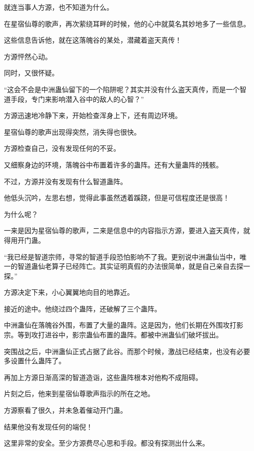 
\begin{this_body}



就连当事人方源，也不知道为什么。

在星宿仙尊的歌声，再次萦绕耳畔的时候，他的心中就莫名其妙地多了一些信息。

这些信息告诉他，就在这落魄谷的某处，潜藏着盗天真传！

方源怦然心动。

同时，又很怀疑。

“这会不会是中洲蛊仙留下的一个陷阱呢？其实并没有什么盗天真传，而是一个智道手段，专门来影响潜入谷中的敌人的心智？”

方源迅速地冷静下来，开始检查浑身上下，还有周边环境。

星宿仙尊的歌声出现得突然，消失得也很快。

方源检查自己，没有发现任何的不妥。

又细察身边的环境，落魄谷中布置着许多的蛊阵。还有大量蛊阵的残骸。

不过，方源并没有发现有什么智道蛊阵。

他低头沉吟，左思右想，觉得此事虽然透着蹊跷，但是可信程度还是很高！

为什么呢？

一来是因为星宿仙尊的歌声，二来是信息中的内容指示方源，要进入盗天真传，就得用开门蛊。

“我已经是智道宗师，寻常的智道手段恐怕影响不了我。更别说中洲蛊仙当中，唯一的智道蛊仙老算子已经阵亡。其实证明真假的办法很简单，就是自己亲自去探一探。”

方源决定下来，小心翼翼地向目的地靠近。

接近的途中。他绕过四个蛊阵，还破解了三个蛊阵。

中洲蛊仙在落魄谷外围，布置了大量的蛊阵。这是因为，他们长期在外围攻打影宗。等到攻打进谷中，影宗蛊仙布置的蛊阵。都被中洲蛊仙们破坏拔出。

突围战之后，中洲蛊仙正式占据了此谷。而那个时候，激战已经结束，也没有必要多设置什么蛊阵了。

再加上方源日渐高深的智道造诣，这些蛊阵根本对他构不成阻碍。

片刻之后，他来到星宿仙尊歌声指示的所在之地。

方源察看了很久，并未急着催动开门蛊。

结果他没有发现任何的端倪！

这里非常的安全。至少方源费尽心思和手段。都没有探测出什么来。


\end{this_body}
